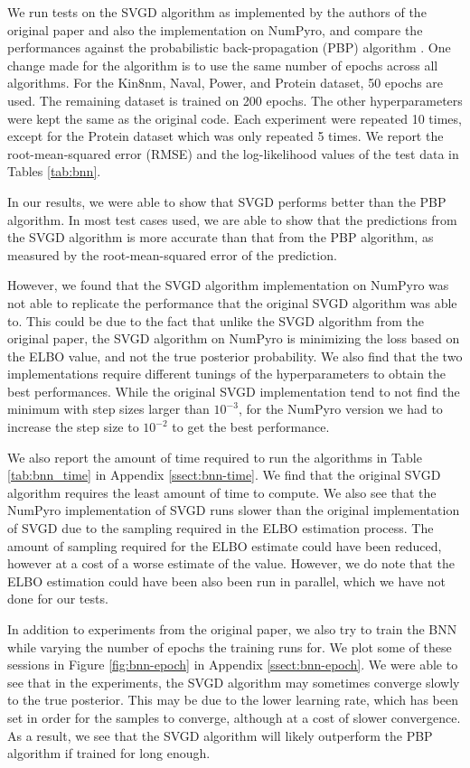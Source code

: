 We run tests on the SVGD algorithm as implemented by the authors of the original paper and also the implementation on NumPyro, and compare the performances against the probabilistic back-propagation (PBP) algorithm \cite{pbp}. One change made for the algorithm is to use the same number of epochs across all algorithms. For the Kin8nm, Naval, Power, and Protein dataset, 50 epochs are used. The remaining dataset is trained on 200 epochs. The other hyperparameters were kept the same as the original code. Each experiment were repeated 10 times, except for the Protein dataset which was only repeated 5 times. We report the root-mean-squared error (RMSE) and the log-likelihood values of the test data in Tables \ref{tab:bnn}. 



In our results, we were able to show that SVGD performs better than the PBP algorithm. In most test cases used, we are able to show that the predictions from the SVGD algorithm is more accurate than that from the PBP algorithm, as measured by the root-mean-squared error of the prediction. 

However, we found that the SVGD algorithm implementation on NumPyro was not able to replicate the performance that the original SVGD algorithm was able to. This could be due to the fact that unlike the SVGD algorithm from the original paper, the SVGD algorithm on NumPyro is minimizing the loss based on the ELBO value, and not the true posterior probability. We also find that the two implementations require different tunings of the hyperparameters to obtain the best performances. While the original SVGD implementation tend to not find the minimum with step sizes larger than $10^{-3}$, for the NumPyro version we had to increase the step size to $10^{-2}$ to get the best performance. 

We also report the amount of time required to run the algorithms in Table \ref{tab:bnn_time} in Appendix \ref{ssect:bnn-time}. We find that the original SVGD algorithm requires the least amount of time to compute. We also see that the NumPyro implementation of SVGD runs slower than the original implementation of SVGD due to the sampling required in the ELBO estimation process. The amount of sampling required for the ELBO estimate could have been reduced, however at a cost of a worse estimate of the value. However, we do note that the ELBO estimation could have been also been run in parallel, which we have not done for our tests.

In addition to experiments from the original paper, we also try to train the BNN while varying the number of epochs the training runs for. We plot some of these sessions in Figure \ref{fig:bnn-epoch} in Appendix \ref{ssect:bnn-epoch}. We were able to see that in the experiments, the SVGD algorithm may sometimes converge slowly to the true posterior. This may be due to the lower learning rate, which has been set in order for the samples to converge, although at a cost of slower convergence. As a result, we see that the SVGD algorithm will likely outperform the PBP algorithm if trained for long enough.